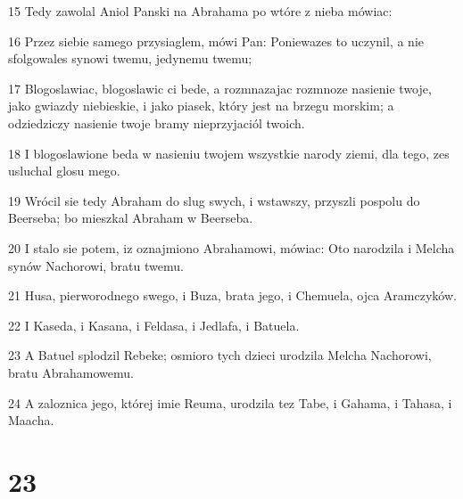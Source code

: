 \par 15 Tedy zawolal Aniol Panski na Abrahama po wtóre z nieba mówiac:
\par 16 Przez siebie samego przysiaglem, mówi Pan: Poniewazes to uczynil, a nie sfolgowales synowi twemu, jedynemu twemu;
\par 17 Blogoslawiac, blogoslawic ci bede, a rozmnazajac rozmnoze nasienie twoje, jako gwiazdy niebieskie, i jako piasek, który jest na brzegu morskim; a odziedziczy nasienie twoje bramy nieprzyjaciól twoich.
\par 18 I blogoslawione beda w nasieniu twojem wszystkie narody ziemi, dla tego, zes usluchal glosu mego.
\par 19 Wrócil sie tedy Abraham do slug swych, i wstawszy, przyszli pospolu do Beerseba; bo mieszkal Abraham w Beerseba.
\par 20 I stalo sie potem, iz oznajmiono Abrahamowi, mówiac: Oto narodzila i Melcha synów Nachorowi, bratu twemu.
\par 21 Husa, pierworodnego swego, i Buza, brata jego, i Chemuela, ojca Aramczyków.
\par 22 I Kaseda, i Kasana, i Feldasa, i Jedlafa, i Batuela.
\par 23 A Batuel splodzil Rebeke; osmioro tych dzieci urodzila Melcha Nachorowi, bratu Abrahamowemu.
\par 24 A zaloznica jego, której imie Reuma, urodzila tez Tabe, i Gahama, i Tahasa, i Maacha.

\chapter{23}

